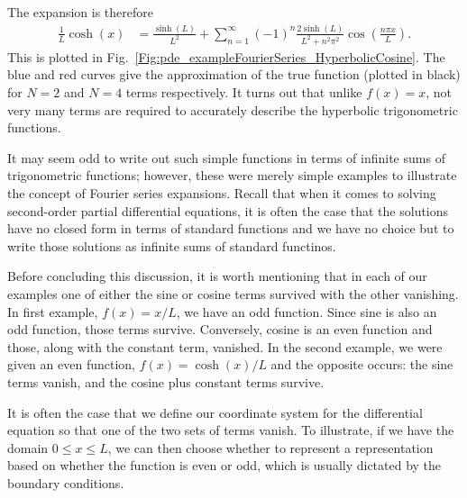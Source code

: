 The expansion is therefore
\begin{align}
  \frac{1}{L} \cosh(x) &=  \frac{\sinh(L)}{L^2} + \sum_{n=1}^\infty (-1)^n \frac{ 2 \sinh(L) }{ L^2 + n^2 \pi^2 } \cos \left( \frac{n \pi x }{ L } \right) . \nonumber
\end{align}
This is plotted in Fig.~\ref{Fig:pde_exampleFourierSeries_HyperbolicCosine}. The blue and red curves give the approximation of the true function (plotted in black) for $N = 2$ and $N = 4$ terms respectively. It turns out that unlike $f(x) = x$, not very many terms are required to accurately describe the hyperbolic trigonometric functions.

It may seem odd to write out such simple functions in terms of infinite sums of trigonometric functions; however, these were merely simple examples to illustrate the concept of Fourier series expansions. Recall that when it comes to solving second-order partial differential equations, it is often the case that the solutions have no closed form in terms of standard functions and we have no choice but to write those solutions as infinite sums of standard functinos.

Before concluding this discussion, it is worth mentioning that in each of our examples one of either the sine or cosine terms survived with the other vanishing. In first example, $f(x) = x/L$, we have an odd function. Since sine is also an odd function, those terms survive. Conversely, cosine is an even function and those, along with the constant term, vanished. In the second example, we were given an even function, $f(x) = \cosh(x)/L$ and the opposite occurs: the sine terms vanish, and the cosine plus constant terms survive. 

It is often the case that we define our coordinate system for the differential equation so that one of the two sets of terms vanish. To illustrate, if we have the domain $0 \le x \le L$, we can then choose whether to represent a representation based on whether the function is even or odd, which is usually dictated by the boundary conditions. 

